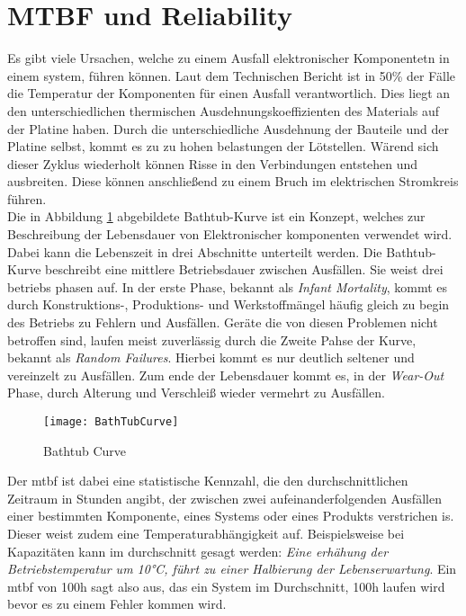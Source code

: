 \section{MTBF und Reliability}
Es gibt viele Ursachen, welche zu einem Ausfall elektronischer Komponentetn in einem system, führen können. Laut dem Technischen Bericht \cite{AIP} ist in 50\% der Fälle die Temperatur der Komponenten für einen Ausfall verantwortlich. Dies liegt an den unterschiedlichen thermischen Ausdehnungskoeffizienten des Materials auf der Platine haben. Durch die unterschiedliche Ausdehnung der Bauteile und der Platine selbst, kommt es zu zu hohen belastungen der Lötstellen. Wärend sich dieser Zyklus wiederholt  können Risse in den Verbindungen entstehen und ausbreiten. Diese können anschließend zu einem Bruch im elektrischen Stromkreis führen. \cite{AREPA_LifeExpectancy}\\
Die in Abbildung \ref{fig:BathTubCurve} abgebildete Bathtub-Kurve ist ein Konzept, welches zur Beschreibung der Lebensdauer von Elektronischer komponenten verwendet wird. Dabei kann die Lebenszeit in drei Abschnitte unterteilt werden. Die Bathtub-Kurve beschreibt eine mittlere Betriebsdauer zwischen Ausfällen. Sie weist drei betriebs phasen auf. 
In der erste Phase, bekannt als \textit{Infant Mortality}, kommt es durch Konstruktions-, Produktions- und Werkstoffmängel häufig gleich zu begin des Betriebs zu Fehlern und Ausfällen. Geräte die von diesen Problemen nicht betroffen sind, laufen meist zuverlässig durch die Zweite Pahse der Kurve, bekannt als \textit{Random Failures}. Hierbei kommt es nur deutlich seltener und vereinzelt zu Ausfällen. Zum ende der Lebensdauer kommt es, in der \textit{Wear-Out} Phase, durch Alterung und Verschleiß wieder vermehrt zu Ausfällen. \cite{AREPA_LifeExpectancy}\\ 
\begin{center}
    \begin{figure}[h!]
     \centering
     \texttt{[image: BathTubCurve]}
     \caption{Bathtub Curve \cite{AREPA_LifeExpectancy}}
    \label{fig:BathTubCurve}
    \end{figure}
\end{center}
\vspace{-2cm}
Der \ac{mtbf} ist dabei eine statistische Kennzahl, die den durchschnittlichen Zeitraum in Stunden angibt, der zwischen zwei aufeinanderfolgenden Ausfällen einer bestimmten Komponente, eines Systems oder eines Produkts verstrichen is. Dieser weist zudem eine Temperaturabhängigkeit auf. Beispielsweise bei Kapazitäten kann im durchschnitt gesagt werden: \textit{Eine erhähung der Betriebstemperatur um 10°C, führt zu einer Halbierung der Lebenserwartung}. Ein \ac{mtbf} von 100h sagt also aus, das ein System im Durchschnitt, 100h laufen wird bevor es zu einem Fehler kommen wird.\cite{MTBFReliability}\\
